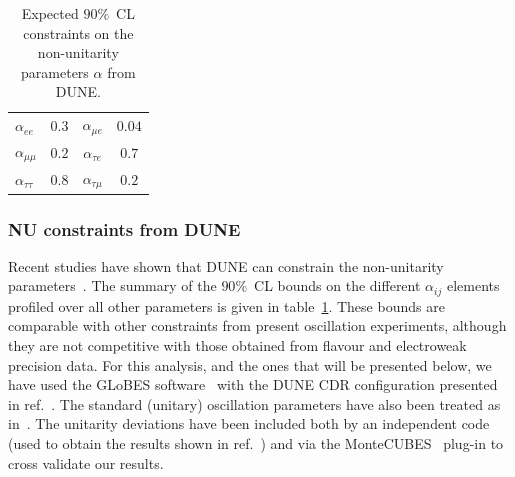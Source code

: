 \begin{table}[htb]
\caption{\label{tab:bounds} Expected $90 \%$~CL constraints on the non-unitarity parameters $\alpha$ from DUNE. }
\begin{center}
\renewcommand{\arraystretch}{1.6}
\begin{tabular}{  l@{\quad\quad}  c@{\quad\quad}   c@{\quad\quad}   c@{\quad\quad}      }
\hline
$\alpha_{ee}$ & $0.3$ & $\alpha_{\mu e}$ & $0.04$  \\
$\alpha_{\mu\mu}$ & $0.2$ & $\alpha_{\tau e}$ & $0.7$ \\
$\alpha_{\tau\tau}$ & $0.8$ & $\alpha_{\tau\mu}$ & $0.2$  \\ \hline
\end{tabular}
\end{center}
\end{table}

\subsubsection{NU constraints from DUNE}
Recent studies have shown that DUNE can constrain the non-unitarity parameters~\cite{Blennow:2016jkn, Escrihuela:2016ube}. The summary of the $90 \%$~CL bounds on the different $\alpha_{ij}$ elements profiled over all other parameters is given in table~\ref{tab:bounds}.
These bounds are comparable with other constraints from present oscillation experiments, although they are not competitive with those obtained from flavour and electroweak precision data.
For this analysis, and the ones that will be presented below, we have used the GLoBES software~\cite{Huber:2004ka,Huber:2007ji} with the DUNE CDR configuration presented in ref.~\cite{Alion:2016uaj}. The standard (unitary) oscillation parameters have also been treated as in~\cite{Alion:2016uaj}. The unitarity deviations have been included both by an independent code (used to obtain the results shown in ref.~\cite{Escrihuela:2016ube}) and via the MonteCUBES~\cite{Blennow:2009pk} plug-in to cross validate our results.

